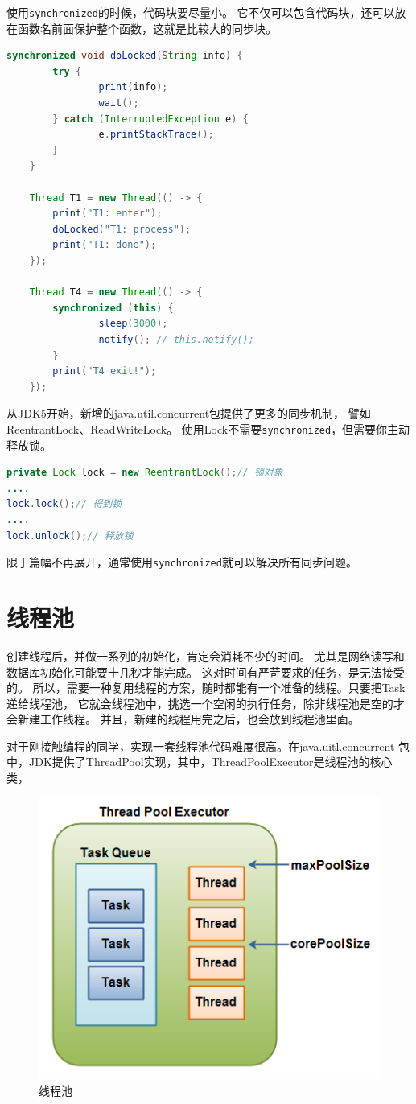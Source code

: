 使用\lstinline{synchronized}的时候，代码块要尽量小。
它不仅可以包含代码块，还可以放在函数名前面保护整个函数，这就是比较大的同步块。

\begin{lstlisting}[language=Java]
	synchronized void doLocked(String info) {
		try {
				print(info);
				wait();
		} catch (InterruptedException e) {
				e.printStackTrace();
		}
	}

	Thread T1 = new Thread(() -> {
		print("T1: enter");
		doLocked("T1: process");
		print("T1: done");
	});

	Thread T4 = new Thread(() -> {
		synchronized (this) {
				sleep(3000);
				notify(); // this.notify();
		}
		print("T4 exit!");
	});
\end{lstlisting}
从JDK5开始，新增的java.util.concurrent包提供了更多的同步机制，
譬如ReentrantLock、ReadWriteLock。
使用Lock不需要\lstinline{synchronized}，但需要你主动释放锁。

\begin{lstlisting}[language=Java]
private Lock lock = new ReentrantLock();// 锁对象
....
lock.lock();// 得到锁
....
lock.unlock();// 释放锁  
\end{lstlisting}

\noindent
限于篇幅不再展开，通常使用\lstinline{synchronized}就可以解决所有同步问题。

\section{线程池}
创建线程后，并做一系列的初始化，肯定会消耗不少的时间。
尤其是网络读写和数据库初始化可能要十几秒才能完成。
这对时间有严苛要求的任务，是无法接受的。
所以，需要一种复用线程的方案，随时都能有一个准备的线程。只要把Task递给线程池，
它就会线程池中，挑选一个空闲的执行任务，除非线程池是空的才会新建工作线程。
并且，新建的线程用完之后，也会放到线程池里面。

对于刚接触编程的同学，实现一套线程池代码难度很高。在java.uitl.concurrent
包中，JDK提供了ThreadPool实现，其中，ThreadPoolExecutor是线程池的核心类，

\begin{figure}[!htb]
\centerline{\includegraphics[width=.25\figwidth]{images/thread-pool-executor.png}}
\caption{线程池}
\label{fig:part1_thread_pool}
\end{figure}

